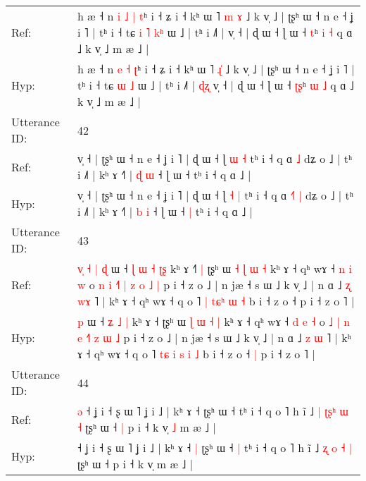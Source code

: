 \documentclass[10pt]{article}
\DeclareRobustCommand{\hl}[1]{{\textcolor{red}{#1}}}
\begin{document}
\begin{longtable}{ll}
Ref: & h æ ˧ n\hl{ }\hl{i} \hl{˩} \hl{|} \hl{t}ʰ i ˧ ʑ i ˧ kʰ ɯ ˥ \hl{m}\hl{ }\hl{ɤ} ˩ k v̩ ˩ | ʈʂʰ ɯ ˧ n e ˧ ʝ i ˥ | tʰ i ˧ tɕ\hl{ }\hl{i} \hl{˥} \hl{k}\hl{ʰ} ɯ ˩ | tʰ i ˩˥ |\hl{}\hl{}\hl{} v̩ ˧ | ɖ ɯ ˧ ɭ ɯ ˧ \hl{}\hl{t}ʰ \hl{i} \hl{˧} q ɑ ˩ k v̩ ˩ m æ ˩ |
 \\
Hyp: & h æ ˧ n\hl{}\hl{} \hl{e} \hl{˧} \hl{ʈ}ʰ i ˧ ʑ i ˧ kʰ ɯ ˥ \hl{}\hl{ɻ}\hl{̍} ˩ k v̩ ˩ | ʈʂʰ ɯ ˧ n e ˧ ʝ i ˥ | tʰ i ˧ tɕ\hl{}\hl{} \hl{ɯ} \hl{}\hl{˩} ɯ ˩ | tʰ i ˩˥ |\hl{ }\hl{ɖ}\hl{ʐ} v̩ ˧ | ɖ ɯ ˧ ɭ ɯ ˧ \hl{ʈ}\hl{ʂ}ʰ \hl{ɯ} \hl{˩} q ɑ ˩ k v̩ ˩ m æ ˩ |
 \\
\midrule
Utterance ID: & 42 \\
Ref: & v̩ ˧ | ʈʂʰ ɯ ˧ n e ˧ ʝ i ˥ | ɖ ɯ ˧ ɭ \hl{ɯ} \hl{˧} tʰ i ˧ q ɑ\hl{}\hl{}\hl{} \hl{˩} dʑ o ˩ | tʰ i ˩˥ | kʰ ɤ ˧˥ | \hl{ɖ} \hl{ɯ} ˧ ɭ ɯ ˧\hl{}\hl{} tʰ i ˧ q ɑ ˩ |
 \\
Hyp: & v̩ ˧ | ʈʂʰ ɯ ˧ n e ˧ ʝ i ˥ | ɖ ɯ ˧ ɭ \hl{˧} \hl{|} tʰ i ˧ q ɑ\hl{ }\hl{˧}\hl{˥} \hl{|} dʑ o ˩ | tʰ i ˩˥ | kʰ ɤ ˧˥ | \hl{b} \hl{i} ˧ ɭ ɯ ˧\hl{ }\hl{|} tʰ i ˧ q ɑ ˩ |
 \\
\midrule
Utterance ID: & 43 \\
Ref: & \hl{v}\hl{̩}\hl{ }\hl{˧}\hl{ }\hl{|}\hl{ }\hl{ɖ} ɯ ˧\hl{ }\hl{ɭ} \hl{ɯ} \hl{˧} \hl{ʈ}\hl{ʂ} kʰ ɤ ˧\hl{˥}\hl{ }\hl{|} ʈʂʰ ɯ \hl{˧} \hl{ɭ} \hl{ɯ} \hl{˧} kʰ ɤ ˧ qʰ wɤ ˧ \hl{n} \hl{i} \hl{w} o \hl{n} \hl{i} \hl{˧}\hl{˥} \hl{|} \hl{}\hl{z} \hl{o} \hl{˩} \hl{|} p i ˧ z o ˩ | n jæ ˧ s ɯ ˩ k v̩ ˩ | n ɑ ˩ \hl{ʐ} \hl{w}\hl{ɤ} ˥ | kʰ ɤ ˧ qʰ wɤ ˧ q o ˥ \hl{}\hl{|} \hl{t}\hl{ɕ}\hl{ʰ} \hl{ɯ} \hl{˧} b i ˧ z o ˧\hl{}\hl{} p i ˧ z o ˥ |
 \\
Hyp: & \hl{}\hl{}\hl{}\hl{}\hl{}\hl{}\hl{}\hl{p} ɯ ˧\hl{}\hl{} \hl{ʑ} \hl{˩} \hl{}\hl{|} kʰ ɤ ˧\hl{}\hl{}\hl{} ʈʂʰ ɯ \hl{ɭ} \hl{ɯ} \hl{˧} \hl{|} kʰ ɤ ˧ qʰ wɤ ˧ \hl{d} \hl{e} \hl{˧} o \hl{˩} \hl{|} \hl{}\hl{n} \hl{e} \hl{˧}\hl{˥} \hl{z} \hl{ɯ} \hl{˩} p i ˧ z o ˩ | n jæ ˧ s ɯ ˩ k v̩ ˩ | n ɑ ˩ \hl{z} \hl{}\hl{ɯ} ˥ | kʰ ɤ ˧ qʰ wɤ ˧ q o ˥ \hl{t}\hl{ɕ} \hl{i}\hl{ }\hl{s} \hl{i} \hl{˩} b i ˧ z o ˧\hl{ }\hl{|} p i ˧ z o ˥ |
 \\
\midrule
Utterance ID: & 44 \\
Ref: & \hl{ə}\hl{ }˧ ʝ i ˧ ʂ ɯ ˥ ʝ i ˩ | kʰ ɤ ˧\hl{}\hl{} ʈʂʰ ɯ ˧\hl{}\hl{} tʰ i ˧ q o ˥ h ĩ ˩ \hl{|} \hl{ʈ}\hl{ʂ}\hl{ʰ} \hl{ɯ} \hl{˧} ʈʂʰ ɯ ˧\hl{ }\hl{|} p i ˧ k v̩\hl{ }\hl{˩} m æ ˩ |
 \\
Hyp: & \hl{}\hl{}˧ ʝ i ˧ ʂ ɯ ˥ ʝ i ˩ | kʰ ɤ ˧\hl{ }\hl{|} ʈʂʰ ɯ ˧\hl{ }\hl{|} tʰ i ˧ q o ˥ h ĩ ˩ \hl{ʐ} \hl{}\hl{}\hl{o} \hl{˧} \hl{|} ʈʂʰ ɯ ˧\hl{}\hl{} p i ˧ k v̩\hl{}\hl{} m æ ˩ |
 \\

\end{longtable}
\end{document}
